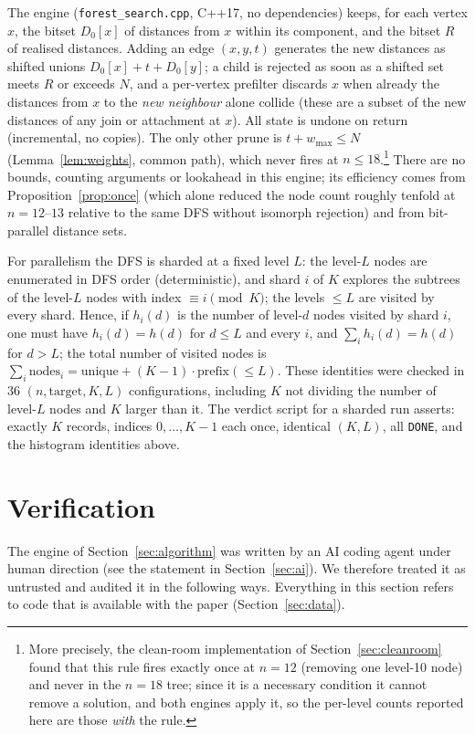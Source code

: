 \documentclass[11pt,a4paper]{article}
\theoremstyle{plain}
\theoremstyle{remark}
\newcommand{\file}[1]{\texttt{#1}}
\begin{document}
The engine (\file{forest\_search.cpp}, C++17, no dependencies) keeps, for each
vertex $x$, the bitset $D_0[x]$ of distances from $x$ within its component, and
the bitset $R$ of realised distances.  Adding an edge $(x,y,t)$ generates the new
distances as shifted unions $D_0[x]+t+D_0[y]$; a child is rejected as soon as a
shifted set meets $R$ or exceeds $N$, and a per-vertex prefilter discards $x$
when already the distances from $x$ to the \emph{new neighbour} alone collide
(these are a subset of the new distances of any join or attachment at $x$).  All
state is undone on return (incremental, no copies).  The only other prune is
$t+w_{\max}\le N$ (Lemma~\ref{lem:weights}, common path), which never fires at
$n\le 18$.\footnote{More precisely, the clean-room implementation of
Section~\ref{sec:cleanroom} found that this rule fires exactly once at $n=12$
(removing one level-10 node) and never in the $n=18$ tree; since it is a
necessary condition it cannot remove a solution, and both engines apply it, so
the per-level counts reported here are those \emph{with} the rule.}  There are
no bounds, counting arguments or lookahead in this engine; its efficiency comes
from Proposition~\ref{prop:once} (which alone reduced the node count roughly
tenfold at $n=12$--$13$ relative to the same DFS without isomorph rejection) and
from bit-parallel distance sets.

For parallelism the DFS is sharded at a fixed level $L$: the level-$L$ nodes are
enumerated in DFS order (deterministic), and shard $i$ of $K$ explores the
subtrees of the level-$L$ nodes with index $\equiv i \pmod K$; the levels $\le L$
are visited by every shard.  Hence, if $h_i(d)$ is the number of level-$d$ nodes
visited by shard $i$, one must have $h_i(d)=h(d)$ for $d\le L$ and every $i$,
and $\sum_i h_i(d)=h(d)$ for $d>L$; the total number of visited nodes is
$\sum_i\mathrm{nodes}_i=\mathrm{unique}+(K-1)\cdot\mathrm{prefix}(\le L)$.
These identities were checked in $36$ $(n,\text{target},K,L)$ configurations,
including $K$ not dividing the number of level-$L$ nodes and $K$ larger than it.
The verdict script for a sharded run asserts: exactly $K$ records, indices
$0,\dots,K-1$ each once, identical $(K,L)$, all \texttt{DONE}, and the histogram
identities above.

\section{Verification}\label{sec:verification}

The engine of Section~\ref{sec:algorithm} was written by an AI coding agent
under human direction (see the statement in Section~\ref{sec:ai}).  We
therefore treated it as untrusted and audited it in the following ways.
Everything in this section refers to code that is available with the paper
(Section~\ref{sec:data}).
\end{document}
